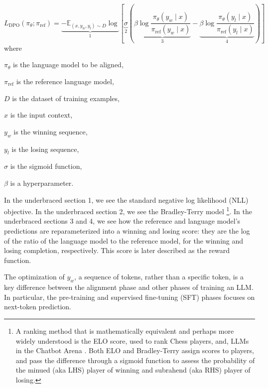 \documentclass[twoside,11pt]{article}
\begin{document}
\begin{equation}
  \label{eq:dpo}
  L_\mathrm{DPO}(\pi_\theta; \pi_\mathrm{ref}) =
  \underbrace{
  -\mathbb{E}_{(x, y_w, y_l) \sim D} 
  \log }_{1} 
  \left[ 
    \underbrace{\sigma }_{2}
    \left(
    \underbrace{\beta \log \frac{\pi_\theta(y_w \mid x)}{\pi_\mathrm{ref}(y_w \mid x)}}_{3}
    - \underbrace{\beta \log \frac{\pi_\theta(y_l \mid x)}{\pi_\mathrm{ref}(y_l \mid x)}}_{4} 
    \right)
  \right]
\end{equation}
where
\begin{description}
  \item $\pi_\theta$ is the language model to be aligned,
  \item $\pi_\mathrm{ref}$ is the reference language model,
  \item $D$ is the dataset of training examples,
  \item $x$ is the input context,
  \item $y_w$ is the winning sequence,
  \item $y_l$ is the losing sequence,
  \item $\sigma$ is the sigmoid function,
  \item $\beta$ is a hyperparameter.
\end{description}

In the underbraced section 1, we see the standard 
negative log likelihood (NLL) objective.
In the underbraced section 2, we see the Bradley-Terry model 
\footnote{A ranking method that is mathematically equivalent and perhaps more 
widely understood is the ELO score, used to rank Chess players, 
and, LLMs in the Chatbot Arena \citep{elo1978rating,chiang2024chatbot}. 
Both ELO and Bradley-Terry assign scores to players, and 
pass the difference through a sigmoid function to assess the probability of 
the minued (aka LHS) player of winning and subrahend (aka RHS) player of losing.}.
In the underbraced sections 3 and 4, we see how the 
reference and language model's predictions are reparameterized
into a winning and losing score: they are the 
log of the ratio of the language model to the reference model, for the winning and 
losing completion, respectively. 
This score is later described as the reward function.

The optimization of $y_w$, a sequence of tokens, rather than
a specific token, is a key difference between the alignment phase and
other phases of training an LLM. In particular, the 
pre-training and supervised fine-tuning (SFT) phases 
focuses on next-token prediction. 
\end{document}
